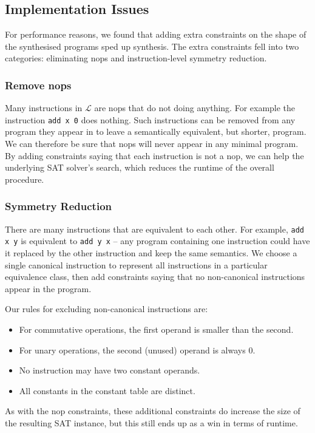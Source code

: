 \documentclass[a4paper]{llncs}
\begin{document}
\subsection{Implementation Issues}
For performance reasons, we found that adding extra constraints on the
shape of the synthesised programs sped up synthesis.  The extra constraints
fell into two categories: eliminating nops and instruction-level symmetry reduction.

\subsubsection{Remove nops}
Many instructions in $\mathcal{L}$ are nops that do not doing anything.
For example the instruction \verb|add x 0| does nothing.  Such instructions
can be removed from any program they appear in to leave a semantically
equivalent, but shorter, program.  We can therefore be sure that nops
will never appear in any minimal program.  By adding constraints saying that
each instruction is not a nop, we can help the underlying SAT solver's
search, which reduces the runtime of the overall procedure.

\subsubsection{Symmetry Reduction}
There are many instructions that are equivalent to each other.  For example,
\verb|add x y| is equivalent to \verb|add y x| -- any program containing
one instruction could have it replaced by the other instruction and
keep the same semantics.  We choose a single canonical instruction to
represent all instructions in a particular equivalence class, then add
constraints saying that no non-canonical instructions appear in the program.

Our rules for excluding non-canonical instructions are:

\begin{itemize}
 \item For commutative operations, the first operand is smaller than the second.
 \item For unary operations, the second (unused) operand is always 0.
 \item No instruction may have two constant operands.
 \item All constants in the constant table are distinct.
\end{itemize}

As with the nop constraints, these additional constraints do increase the
size of the resulting SAT instance, but this still ends up as a win in
terms of runtime.
\end{document}
